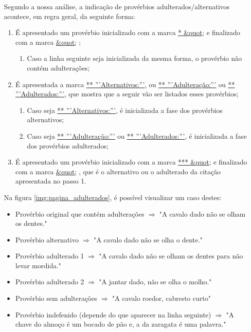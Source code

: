 \documentclass[11pt,a4paper]{report}
\begin{document}
Segundo a nossa análise, a indicação de provérbios adulterados/alternativos acontece, em regra geral, da seguinte forma:
\begin{enumerate}
\item É apresentado um provérbio inicializado com a marca \underline{* \&quot;} e finalizado com a marca \underline{\&quot;} ;
	\begin{enumerate}
		\item Caso a linha seguinte seja inicializada da mesma forma, o provérbio não contém adulterações;
	\end{enumerate}
\item É apresentada a marca \underline{** '''Alternativos:'''}, ou \underline{** '''Adulteração:'''} ou \underline{** '''Adulterados:'''}, que mostra que a seguir vão ser listados esses provérbios;
	\begin{enumerate}
		\item Caso seja \underline{** '''Alternativos:'''}, é inicializada a fase dos provérbios alternativos;
		\item Caso seja \underline{** '''Adulteração:'''} ou \underline{** '''Adulterados:'''}, é inicializada a fase dos provérbios adulterados;
	\end{enumerate}
\item É apresentado um provérbio inicializado com a marca \underline{*** \&quot;} e finalizado com a marca \underline{\&quot;} , que é o alternativo ou o adulterado da citação apresentada no passo 1.
\end{enumerate}

\vspace{0.2cm}

Na figura \ref{img:pagina_adulterados}, é possível visualizar um caso destes:

\begin{itemize}
\item Provérbio original que contém adulterações $\Rightarrow$ "A cavalo dado não se olham os dentes."
\item Provérbio alternativo $\Rightarrow$ "A cavalo dado não se olha o dente."
\item Provérbio adulterado 1 $\Rightarrow$ "A cavalo dado não se olham os dentes para não levar mordida."
\item Provérbio adulterado 2 $\Rightarrow$ "A jantar dado, não se olha o molho."
\item Provérbio sem adulterações $\Rightarrow$ "A cavalo roedor, cabresto curto"
\item Provérbio indefenido (depende do que aparecer na linha seguinte) $\Rightarrow$ "A chave do almoço é um bocado de pão e, a da zaragata é uma palavra."
\end{itemize}
\end{document}
